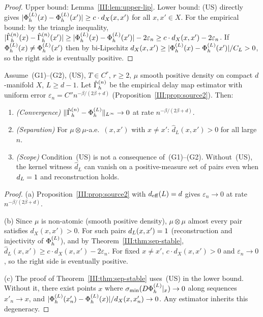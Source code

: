 \begin{proof}
Upper bound: Lemma~\ref{III:lem:upper-lip}.
Lower bound: (US) directly gives $|\Phi_h^{(L)}(x) - \Phi_h^{(L)}(x')| \geq c \cdot d_X(x,x')$
for all $x, x' \in X$.
For the empirical bound: by the triangle inequality,
$|\hat{\Gamma}_h^{(n)}(x) - \hat{\Gamma}_h^{(n)}(x')| \geq |\Phi_h^{(L)}(x) - \Phi_h^{(L)}(x')| - 2\varepsilon_n
\geq c \cdot d_X(x,x') - 2\varepsilon_n$.
If $\Phi_h^{(L)}(x) \neq \Phi_h^{(L)}(x')$ then by bi-Lipschitz $d_X(x,x') \geq |\Phi_h^{(L)}(x)-\Phi_h^{(L)}(x')|/C_L > 0$,
so the right side is eventually positive.
\end{proof}

\begin{theorem}
\label{III:thm:dynamics}
Assume~(G1)--(G2), (US), $T \in C^r$, $r \geq 2$, $\mu$ smooth positive
density on compact $d$-manifold $X$, $L \geq d-1$.
Let $\hat{\Gamma}_h^{(n)}$ be the empirical delay map estimator with uniform error
$\varepsilon_n = C'' n^{-\beta/(2\beta+d)}$ (Proposition~\ref{III:prop:source2}).
Then:
\begin{enumerate}[label=(\alph*)]
  \item \emph{(Convergence)} $\|\hat{\Gamma}_h^{(n)} - \Phi_h^{(L)}\|_{L^{\infty}} \to 0$ at
    rate $n^{-\beta/(2\beta+d)}$.
  \item \emph{(Separation)} For $\mu \otimes \mu$-a.e.\ $(x,x')$ with
    $x \neq x'$: $\widehat{d}_L(x,x') > 0$ for all large $n$.
  \item \emph{(Scope)} Condition~(US) is not a consequence of~(G1)--(G2).
    Without~(US), the kernel witness $\widehat{d}_L$ can vanish on a positive-measure
    set of pairs even when $d_{L} = 1$ and reconstruction holds.
\end{enumerate}
\end{theorem}

\begin{proof}
(a) Proposition~\ref{III:prop:source2} with $d_{\mathrm{eff}}(L) = d$ gives
$\varepsilon_n \to 0$ at rate $n^{-\beta/(2\beta+d)}$.

(b) Since $\mu$ is non-atomic (smooth positive density), $\mu \otimes \mu$
almost every pair satisfies $d_X(x,x') > 0$.
For such pairs $d_{L}(x,x') = 1$ (reconstruction and injectivity of $\Phi_h^{(L)}$),
and by Theorem~\ref{III:thm:sep-stable}, $\widehat{d}_L(x,x') \geq c \cdot d_X(x,x') - 2\varepsilon_n$.
For fixed $x \neq x'$, $c \cdot d_X(x,x') > 0$ and $\varepsilon_n \to 0$,
so the right side is eventually positive.

(c) The proof of Theorem~\ref{III:thm:sep-stable} uses~(US) in the lower bound.
Without it, there exist points $x$ where $\sigma_{\min}(D\Phi_h^{(L)}|_x) \to 0$
along sequences $x'_n \to x$, and $|\Phi_h^{(L)}(x_n') - \Phi_h^{(L)}(x)| / d_X(x,x'_n) \to 0$.
Any estimator inherits this degeneracy.
\end{proof}

